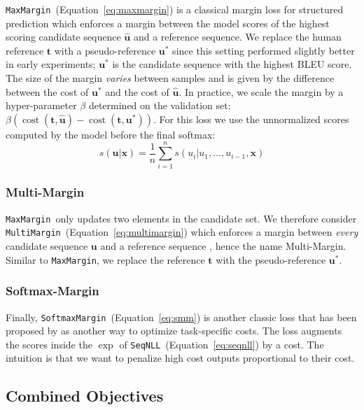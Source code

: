 \documentclass[11pt,a4paper]{article}
\newcommand{\source}{\mathbf{x}}
\newcommand{\pseudoreference}{\mathbf{u}^*}
\newcommand{\goldreference}{\mathbf{t}}
\newcommand{\candhypo}{\mathbf{u}}
\newcommand{\candhypotok}{u}
\newcommand{\SeqNLL}{\texttt{SeqNLL}}
\newcommand{\MaxMargin}{\texttt{MaxMargin}}
\newcommand{\MultiMargin}{\texttt{MultiMargin}}
\newcommand{\SoftmaxMargin}{\texttt{SoftmaxMargin}}
\begin{document}
\MaxMargin~(Equation~\ref{eq:maxmargin}) is a classical margin loss for structured prediction \citep{mmmn, structure_pred} which enforces a margin between the model scores of the highest scoring candidate sequence $\hat{\candhypo}$ and a reference sequence.
We replace the human reference $\goldreference$ with a pseudo-reference $\pseudoreference$ since this setting performed slightly better in early experiments; $\pseudoreference$ is the candidate sequence with the highest BLEU score.
The size of the margin \emph{varies} between samples and is given by the difference between the cost of $\pseudoreference$ and the cost of $\hat{\candhypo}$.
In practice, we scale the margin by a hyper-parameter $\beta$ determined on the validation set: $\beta(\operatorname{cost}(\goldreference,\hat{\candhypo}) - \operatorname{cost}(\goldreference,\pseudoreference))$.
For this loss we use the unnormalized scores computed by the model before the final softmax:
$$s(\candhypo | \source) = \frac{1}{n} \sum_{i=1}^n s(\candhypotok_{i} | \candhypotok_1, \dots, \candhypotok_{i-1}, \source)$$


\subsubsection*{Multi-Margin}
\label{sec:multimargin}

\MaxMargin~only updates two elements in the candidate set.
We therefore consider \MultiMargin~(Equation~\ref{eq:multimargin}) which enforces a margin between \emph{every} candidate sequence $\candhypo$ and a reference sequence \citep{herbrich199icann}, hence the name Multi-Margin.
Similar to \MaxMargin, we replace the reference $\goldreference$ with the pseudo-reference $\pseudoreference$.


\subsubsection*{Softmax-Margin}
\label{sec:smm}

Finally, \SoftmaxMargin~(Equation~\ref{eq:smm}) is another classic loss that has been proposed by \citet{gimpel+smith2010acl} as another way to optimize task-specific costs.
The loss augments the scores inside the $\exp$ of \SeqNLL~(Equation~\ref{eq:seqnll}) by a cost.
The intuition is that we want to penalize high cost outputs proportional to their cost.



\subsection{Combined Objectives}
\label{sec:comb}
\end{document}
